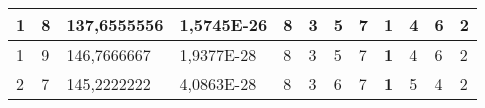 \documentclass[conference]{IEEEtran}
\begin{document}
\begin{table*}[]
\begin{tabular}{|llll|llllllll|}
\multicolumn{1}{|l|}{1}                                                              & \multicolumn{1}{l|}{8}                                                                 & \multicolumn{1}{l|}{137,6555556}                                                           & 1,5745E-26                              & \multicolumn{1}{l|}{8}                                                           & \multicolumn{1}{l|}{3}                                                           & \multicolumn{1}{l|}{5}                                                           & \multicolumn{1}{l|}{7}                                                           & \multicolumn{1}{l|}{\textbf{1}}                                                  & \multicolumn{1}{l|}{4}                                                           & \multicolumn{1}{l|}{6}                                                           & 2                                   \\ \hline
\multicolumn{1}{|l|}{1}                                                              & \multicolumn{1}{l|}{9}                                                                 & \multicolumn{1}{l|}{146,7666667}                                                           & 1,9377E-28                              & \multicolumn{1}{l|}{8}                                                           & \multicolumn{1}{l|}{3}                                                           & \multicolumn{1}{l|}{5}                                                           & \multicolumn{1}{l|}{7}                                                           & \multicolumn{1}{l|}{\textbf{1}}                                                  & \multicolumn{1}{l|}{4}                                                           & \multicolumn{1}{l|}{6}                                                           & 2                                   \\ \hline
\multicolumn{1}{|l|}{2}                                                              & \multicolumn{1}{l|}{7}                                                                 & \multicolumn{1}{l|}{145,2222222}                                                           & 4,0863E-28                              & \multicolumn{1}{l|}{8}                                                           & \multicolumn{1}{l|}{3}                                                           & \multicolumn{1}{l|}{6}                                                           & \multicolumn{1}{l|}{7}                                                           & \multicolumn{1}{l|}{\textbf{1}}                                                  & \multicolumn{1}{l|}{5}                                                           & \multicolumn{1}{l|}{4}                                                           & 2                                   \\ \hline

\end{tabular}
\end{table*}
\end{document}
